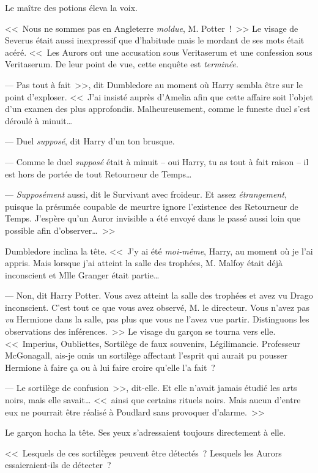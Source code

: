 Le maître des potions éleva la voix.

<<~Nous ne sommes pas en Angleterre \emph{moldue}, M. Potter~!~>> Le visage de Severus était aussi inexpressif que d'habitude mais le mordant de ses mots était acéré. <<~Les Aurors ont une accusation sous Veritaserum et une confession sous Veritaserum. De leur point de vue, cette enquête est \emph{terminée}.

--- Pas tout à fait~>>, dit Dumbledore au moment où Harry sembla être sur le point d'exploser. <<~J'ai insisté auprès d'Amelia afin que cette affaire soit l'objet d'un examen des plus approfondis. Malheureusement, comme le funeste duel s'est déroulé à minuit…

--- Duel \emph{supposé}, dit Harry d'un ton brusque.

--- Comme le duel \emph{supposé} était à minuit -- oui Harry, tu as tout à fait raison -- il est hors de portée de tout Retourneur de Temps…

--- \emph{Supposément} aussi, dit le Survivant avec froideur. Et assez \emph{étrangement}, puisque la présumée coupable de meurtre ignore l'existence des Retourneur de Temps. J'espère qu'un Auror invisible a été envoyé dans le passé aussi loin que possible afin d'observer…~>>

Dumbledore inclina la tête. <<~J'y ai été \emph{moi-même}, Harry, au moment où je l'ai appris. Mais lorsque j'ai atteint la salle des trophées, M. Malfoy était déjà inconscient et Mlle Granger était partie…

--- Non, dit Harry Potter. Vous avez atteint la salle des trophées et avez vu Drago inconscient. C'est tout ce que vous avez observé, M. le directeur. Vous n'avez pas \emph{vu} Hermione dans la salle, pas plus que vous ne l'avez vue partir. Distinguons les observations des inférences.~>> Le visage du garçon se tourna vers elle. <<~Imperius, Oubliettes, Sortilège de faux souvenirs, Légilimancie. Professeur McGonagall, ais-je omis un sortilège affectant l'esprit qui aurait pu pousser Hermione à faire ça ou à lui faire croire qu'elle l'a fait~?

--- Le sortilège de confusion~>>, dit-elle. Et elle n'avait jamais étudié les arts noirs, mais elle savait… <<~ainsi que certains rituels noirs. Mais aucun d'entre eux ne pourrait être réalisé à Poudlard sans provoquer d'alarme.~>>

Le garçon hocha la tête. Ses yeux s'adressaient toujours directement à elle.

<<~Lesquels de ces sortilèges peuvent être détectés~? Lesquels les Aurors essaieraient-ils de détecter~?

